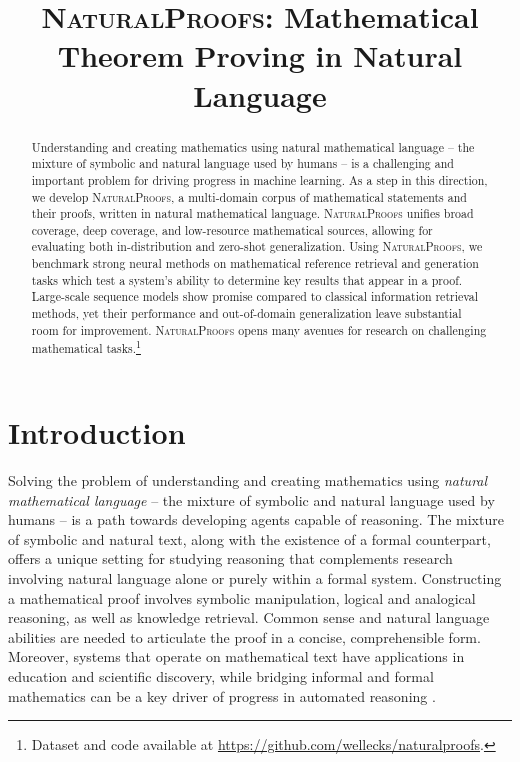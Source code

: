\title{\textsc{NaturalProofs}: Mathematical Theorem Proving in Natural Language}



\maketitle

\begin{abstract}
Understanding and creating mathematics using natural mathematical language -- the mixture of symbolic and natural language used by humans -- is a challenging and important problem for driving progress in machine learning.
As a step in this direction, we develop \textsc{NaturalProofs}, a multi-domain corpus of mathematical statements and their proofs, written in natural mathematical language.
\textsc{NaturalProofs} unifies broad coverage, deep coverage, and low-resource mathematical sources, allowing for evaluating both in-distribution and zero-shot generalization.
Using \textsc{NaturalProofs}, we benchmark strong neural methods on mathematical reference retrieval and generation tasks which test a system's ability to determine key results that appear in a proof.
Large-scale sequence models show promise 
compared to classical information retrieval methods, yet their performance and out-of-domain generalization leave substantial room for improvement.
\textsc{NaturalProofs} opens many avenues for research on challenging mathematical tasks.\footnote{Dataset and code available at \url{https://github.com/wellecks/naturalproofs}.}
\end{abstract}

\section{Introduction}
\label{sec:introduction}

Solving the problem of understanding and creating mathematics using \textit{natural mathematical language} -- the mixture of symbolic and natural language used by humans -- is a path towards developing agents capable of reasoning.
The mixture of symbolic and natural text, 
along with the existence of a formal counterpart, offers a unique setting for studying reasoning that complements research involving natural language alone or purely within a formal system.
Constructing a mathematical proof involves symbolic manipulation, logical and analogical reasoning, as well as knowledge retrieval.
Common sense and natural language abilities are needed to articulate the proof in a concise, comprehensible form.
Moreover, systems that operate on mathematical text have applications in education and scientific discovery, while bridging informal and formal mathematics can be a key driver of progress in automated reasoning \citep{carter2013lurch,kang_document-level_2020,szegedy2020promising}.

